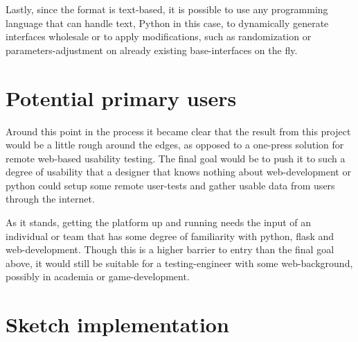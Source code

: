 {  Lastly, since the format is text-based, it is possible to use any programming
  language that can handle text, Python in this case, to dynamically generate
  interfaces wholesale or to apply modifications, such as randomization or
  parameters-adjustment on already existing base-interfaces on the fly.

\section{Potential primary users}

	Around this point in the process it became clear that the result from this
	project would be a little rough around the edges, as opposed to a one-press
	solution for remote web-based usability testing. The final goal would be to
	push it to such a degree of usability that a designer that knows nothing
	about web-development or python could setup some remote user-tests and gather
	usable data from users through the internet.

	As it stands, getting the platform up and running needs the input of an
	individual or team that has some degree of familiarity with python, flask and
	web-development. Though this is a higher barrier to entry than the final goal
	above, it would still be suitable for a testing-engineer with some
	web-background, possibly in academia or game-development.

\section{Sketch implementation}

%
%

%

}
